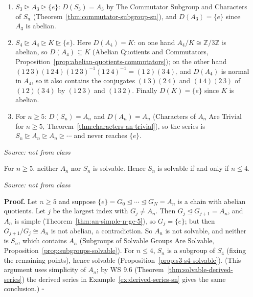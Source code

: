 \documentclass[11pt]{report}
\renewenvironment{proof}[1][Proof]{\noindent\textbf{#1.} }{\hfill$\square$\par\vspace{5pt}}
\newcommand{\srcline}[1]{\par\hfill{\footnotesize\textit{Source: #1}}}
\begin{document}
\begin{exbox}\label{ex:derived-series-sn}
\begin{enumerate}
    \item $S_3 \trianglerighteq A_3 \trianglerighteq \{e\}$: $D(S_3) = A_3$ by The Commutator Subgroup and Characters of $S_n$ (Theorem~\ref{thm:commutator-subgroup-sn}), and $D(A_3) = \{e\}$ since $A_3$ is abelian.
    \item $S_4 \trianglerighteq A_4 \trianglerighteq K \trianglerighteq \{e\}$. Here $D(A_4) = K$: on one hand $A_4/K \cong \mathbb{Z}/3\mathbb{Z}$ is abelian, so $D(A_4) \subseteq K$ (Abelian Quotients and Commutators, Proposition~\ref{prop:abelian-quotients-commutators}); on the other hand $(1\,2\,3)(1\,2\,4)(1\,2\,3)^{-1}(1\,2\,4)^{-1} = (1\,2)(3\,4)$, and $D(A_4)$ is normal in $A_4$, so it also contains the conjugates $(1\,3)(2\,4)$ and $(1\,4)(2\,3)$ of $(1\,2)(3\,4)$ by $(1\,2\,3)$ and $(1\,3\,2)$. Finally $D(K) = \{e\}$ since $K$ is abelian.
    \item For $n \geq 5$: $D(S_n) = A_n$ and $D(A_n) = A_n$ (Characters of $A_n$ Are Trivial for $n \geq 5$, Theorem~\ref{thm:characters-an-trivial}), so the series is $S_n \trianglerighteq A_n \trianglerighteq A_n \trianglerighteq \cdots$ and never reaches $\{e\}$.
\end{enumerate}
\srcline{not from class}
\end{exbox}

\begin{corbox}\label{cor:an-sn-not-solvable}
For $n \geq 5$, neither $A_n$ nor $S_n$ is solvable. Hence $S_n$ is solvable if and only if $n \leq 4$.
\srcline{not from class}
\end{corbox}

\begin{proof}
Let $n \geq 5$ and suppose $\{e\} = G_0 \trianglelefteq \cdots \trianglelefteq G_N = A_n$ is a chain with abelian quotients. Let $j$ be the largest index with $G_j \neq A_n$. Then $G_j \trianglelefteq G_{j+1} = A_n$, and $A_n$ is simple (Theorem~\ref{thm:an-simple-n-ge-5}), so $G_j = \{e\}$; but then $G_{j+1}/G_j \cong A_n$ is not abelian, a contradiction. So $A_n$ is not solvable, and neither is $S_n$, which contains $A_n$ (Subgroups of Solvable Groups Are Solvable, Proposition~\ref{prop:subgroups-solvable}). For $n \leq 4$, $S_n$ is a subgroup of $S_4$ (fixing the remaining points), hence solvable (Proposition~\ref{prop:s3-s4-solvable}). (This argument uses simplicity of $A_n$; by WS 9.6 (Theorem~\ref{thm:solvable-derived-series}) the derived series in Example~\ref{ex:derived-series-sn} gives the same conclusion.)
\end{proof}
\end{document}
